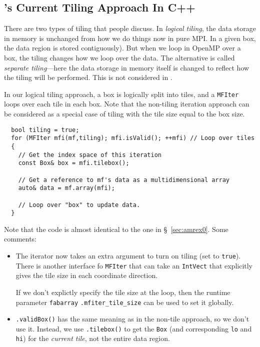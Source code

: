 \subsection{\amrex's Current Tiling Approach In C++}
\label{sec:amrex1}

There are two types of tiling that people discuss.  In {\em logical
tiling}, the data storage in memory is unchanged from how we do things
now in pure MPI.  In a given box, the data region is stored
contiguously).  But when we loop in OpenMP over a box, the tiling
changes how we loop over the data.  The alternative is called {\em
separate tiling}---here the data storage in memory itself is changed
to reflect how the tiling will be performed.  This is not considered
in \amrex.

In our logical tiling approach, a box is logically split into tiles,
and a {\tt MFIter} loops over each tile in each box.  Note that the
non-tiling iteration approach can be considered as a special case of
tiling with the tile size equal to the box size.

\begin{lstlisting}
  bool tiling = true;
  for (MFIter mfi(mf,tiling); mfi.isValid(); ++mfi) // Loop over tiles
  {
    // Get the index space of this iteration
    const Box& box = mfi.tilebox(); 

    // Get a reference to mf's data as a multidimensional array 
    auto& data = mf.array(mfi);

    // Loop over "box" to update data.
  }
\end{lstlisting}
Note that the code is almost identical to the one in \S~\ref{sec:amrex0}.
Some comments:
\begin{itemize}
\item The iterator now takes an extra argument to turn on tiling
(set to {\tt true}).  There is another interface fo {\tt MFIter}
that can take an {\tt IntVect} that explicitly gives the tile size
in each coordinate direction.

If we don't explictly specify the tile size at the loop, then the
runtime parameter {\tt fabarray} {\tt .mfiter\_tile\_size} can be used to set it
globally.

\item {\tt .validBox()} has the same meaning as in the non-tile approach,
so we don't use it.  Instead, we use {\tt .tilebox()} to get the
{\tt Box} (and corresponding {\tt lo} and {\tt hi}) for the {\em
current tile}, not the entire data region.
\end{itemize}

